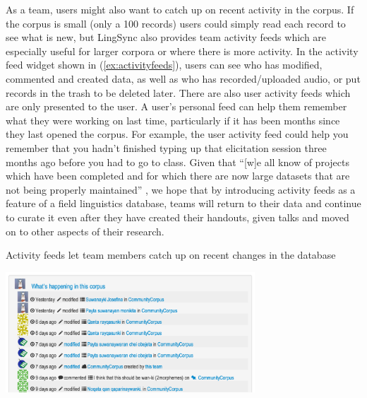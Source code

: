 \documentclass[letterpaper, 12pt, dvips]{mitwpl}
\begin{document}
As a team,
users might also want to catch up on recent activity in the corpus.
If the corpus is small (only a 100 records) users could simply read each record to see what is new,
but LingSync also provides team activity feeds which are especially useful for larger corpora or where there is more activity.
In the activity feed widget shown in (\ref{ex:activityfeeds}), users can see who has modified,
commented and
created data,
as well as who has recorded/uploaded audio,
or put records in the trash to be deleted later.
There are also user activity feeds which are only presented to the user. %
A user's personal feed  can help them remember what they were working on last time,
particularly if it has been months since they last opened the corpus.
For example,
the user activity feed could help you remember that you hadn't finished typing up that elicitation session three months ago before you had to go to class.
Given that ``[w]e all know of projects which have been completed and for which there are now large datasets that are not being properly maintained'' \citep[p.133]{Thieberger:2012}, we hope that by introducing activity feeds as a feature of a field linguistics database, teams will return to their data and continue to curate it even after they have created their handouts, given talks and moved on to other aspects of their research. 

\begin{exe} 
\ex Activity feeds let team members catch up on recent changes in the database

 \centering
   \includegraphics[width=0.7\textwidth]{activityfeeds} 

\label{ex:activityfeeds}
\end{exe}
\end{document}
